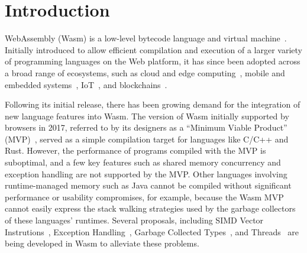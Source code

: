 
\section{Introduction}
\label{sec:intro}

WebAssembly (Wasm) is a low-level bytecode language and virtual machine~\cite{wasm-pldi17}.  Initially introduced to
allow efficient compilation and execution of a larger variety of programming
languages on the Web platform, it has since been adopted across a broad range
of ecosystems, such as cloud and edge computing~\cite{lucet, cloudflare},
mobile and embedded systems~\cite{wasm-embedded}, IoT~\cite{wasm-iot}, and
blockchains~\cite{wasm-blockchain}.

Following its initial release, there has been growing demand for the
integration of new language features into Wasm. The version of Wasm initially
supported by browsers in 2017, referred to by its designers as a ``Minimum
Viable Product'' (MVP)~\cite{wasm-mvp}, served as a simple compilation target
for languages like C/C++ and Rust. However, the performance of
programs compiled with the MVP is suboptimal, and a few key features such as shared
memory concurrency and exception handling are not supported by the MVP. Other
languages involving runtime-managed memory such as Java
cannot be compiled without significant performance
or usability compromises, for example, because the Wasm MVP cannot easily
express the stack walking strategies used by the garbage collectors of
these languages' runtimes. Several proposals, including SIMD
Vector Instrutions~\cite{wasm-simd}, Exception Handling~\cite{wasm-exc}, Garbage Collected Types~\cite{wasm-gc}, and Threads~\cite{wasm-threads}
are being developed in Wasm to alleviate these problems.

